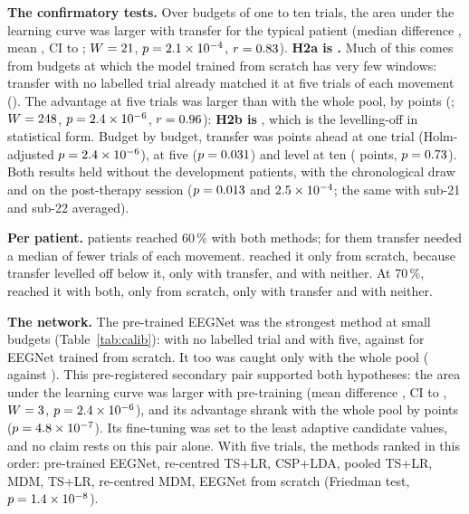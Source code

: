 \textbf{The confirmatory tests.} Over budgets of one to ten trials, the area under the
learning curve was larger with transfer for the typical patient (median difference
\rqTwoHTwoAMedianDiff, mean \rqTwoHTwoADiff, CI \rqTwoHTwoADiffCiLo{} to
\rqTwoHTwoADiffCiHi; $W = 21$, $p = 2.1\times10^{-4}$, $r = 0.83$).
\textbf{H2a is \rqTwoHTwoACategory.} Much of this comes from budgets at which the model trained
from scratch has very few windows: transfer with no labelled trial already matched it at
five trials of each movement (\pct{\rqTwoRestAhSfTsLrKFiveMean}). The advantage at five
trials was larger than with the whole pool, by \rqTwoHTwoBPointsDiff{} points
(\cipts{\rqTwoHTwoBPointsDiffCiLo}{\rqTwoHTwoBPointsDiffCiHi}; $W = 248$,
$p = 2.4\times10^{-6}$, $r = 0.96$): \textbf{H2b is \rqTwoHTwoBCategory}, which is the
levelling-off in statistical form. Budget by budget, transfer was \rqTwoAdvantageKOneDiff{}
points ahead at one trial (Holm-adjusted $p = 2.4\times10^{-6}$),
\rqTwoAdvantageKFiveDiff{} at five ($p = 0.031$) and level at ten
(\rqTwoAdvantageKTenDiff{} points, $p = 0.73$). Both results held
without the development patients, with the chronological draw and on the post-therapy
session ($p = 0.013$ and $2.5\times10^{-4}$; the same with sub-21 and sub-22
averaged).

\textbf{Per patient.} \rqTwoReachRestAhSfSixtyBoth{} patients reached 60\,\% with both
methods; for them transfer needed a median of \rqTwoReachRestAhSfSixtyMedianSaved{}
fewer trials of each movement. \rqTwoReachRestAhSfSixtyOnlyScratch{} reached it only
from scratch, because transfer levelled off below it, \rqTwoReachRestAhSfSixtyOnlyTransfer{}
only with transfer, and \rqTwoReachRestAhSfSixtyNeither{} with neither. At 70\,\%,
\rqTwoReachRestAhSfSeventyBoth{} reached it with both, \rqTwoReachRestAhSfSeventyOnlyScratch{}
only from scratch, \rqTwoReachRestAhSfSeventyOnlyTransfer{} only with transfer and
\rqTwoReachRestAhSfSeventyNeither{} with neither.

\textbf{The network.} The pre-trained EEGNet was the strongest method at small budgets
(Table~\ref{tab:calib}): \pct{\rqTwoRestAhSfEegnetEaFtKZeroMean} with no labelled trial
and \pct{\rqTwoRestAhSfEegnetEaFtKFiveMean} with five, against
\pct{\rqTwoRestAhSfEegnetScratchKFiveMean} for EEGNet trained from scratch. It too was
caught only with the whole pool (\pct{\rqTwoRestAhSfEegnetScratchKAllMean} against
\pct{\rqTwoRestAhSfEegnetEaFtKAllMean}). This pre-registered secondary pair supported
both hypotheses: the area under the learning curve was larger with pre-training (mean
difference \rqTwoEegnetHTwoADiff, CI \rqTwoEegnetHTwoADiffCiLo{} to
\rqTwoEegnetHTwoADiffCiHi, $W = 3$, $p = 2.4\times10^{-6}$), and its
advantage shrank with the whole pool by \rqTwoEegnetHTwoBPointsDiff{} points
($p = 4.8\times10^{-7}$). Its fine-tuning was set to the least adaptive candidate
values, and no claim rests on this pair alone. With five trials, the methods ranked in
this order: pre-trained EEGNet, re-centred TS+LR, CSP+LDA, pooled TS+LR, MDM, TS+LR,
re-centred MDM, EEGNet from scratch (Friedman test, $p = 1.4\times10^{-8}$).

